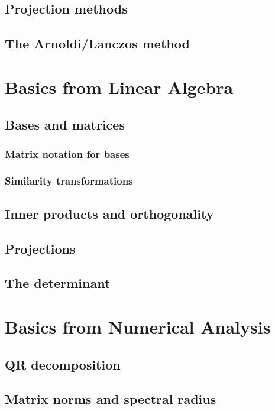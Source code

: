 \section{Projection methods}


\section{The Arnoldi/Lanczos method}



\appendix
\chapter{Basics from Linear Algebra}
\section{Bases and matrices}
\subsection{Matrix notation for bases}

\subsection{Similarity transformations}

\section{Inner products and orthogonality}

\section{Projections}

\section{The determinant}


\chapter{Basics from Numerical Analysis}

\section{QR decomposition}


\section{Matrix norms and spectral radius}

